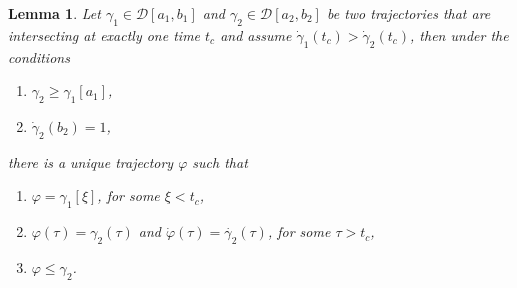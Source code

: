 \documentclass[a4paper]{article}
\theoremstyle{definition}
\theoremstyle{plain}
\newtheorem{lemma}{Lemma\hspace{0.25em}\ignorespaces}
\begin{document}
\begin{lemma}\label{lemma:curvejoining}
  Let $\gamma_{1} \in \mathcal{D}[a_{1}, b_{1}]$ and
  $\gamma_{2} \in \mathcal{D}[a_{2}, b_{2}]$ be two trajectories that are intersecting
  at exactly one time $t_{c}$ and assume
  $\dot{\gamma}_{1}(t_{c}) > \dot{\gamma}_{2}(t_{c})$,
  then under the conditions
  \begin{enumerate}[leftmargin=5em]
    \item[\normalfont(C1)\quad] $\gamma_{2} \geq \gamma_{1}[a_{1}]$,
    \item[\normalfont(C2)\quad] $\dot{\gamma}_{2}(b_{2}) = 1$, %
  \end{enumerate}
  there is a unique trajectory $\varphi$ such that
  \begin{enumerate}[label=(\roman*)\quad,leftmargin=5em]
    \item $\varphi = \gamma_{1}[\xi]$, for some $\xi < t_{c}$,
    \item $\varphi(\tau) = \gamma_{2}(\tau)$ and
          $\dot{\varphi}(\tau) = \dot{\gamma_{2}}(\tau)$, for some $\tau > t_{c}$,
    \item $\varphi \leq \gamma_{2}$.
  \end{enumerate}
\end{lemma}
\end{document}
